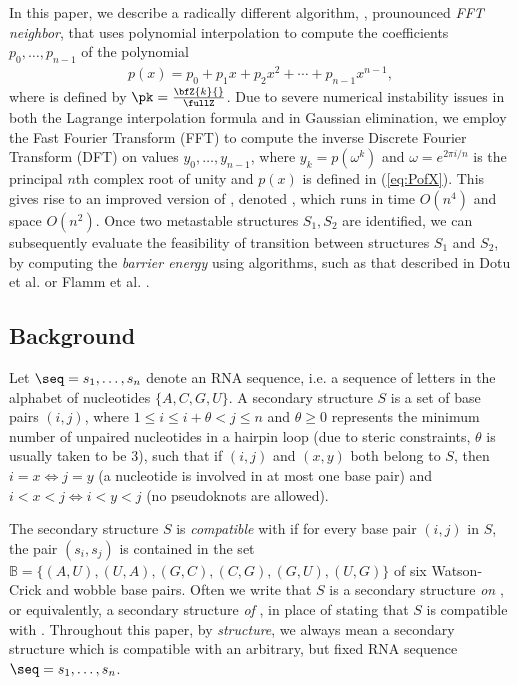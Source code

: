 In this paper, we describe a radically different algorithm, \fftbor,
prounounced {\em FFT neighbor},
that uses polynomial interpolation to compute the
coefficients $p_0,\ldots,p_{n-1}$ of the polynomial
\begin{eqnarray}
\label{eq:PofX}
p(x) = p_0 + p_1 x + p_2 x^2 + \cdots + p_{n-1} x^{n-1},
\end{eqnarray}
where \pk is defined by $\pk = \frac{\bfZ{k}{}}{\fullZ}$.
Due to severe numerical instability issues in both the Lagrange
interpolation formula and in Gaussian elimination, we employ
the Fast Fourier Transform (FFT) to compute the inverse Discrete Fourier
Transform (DFT) on values $y_0,\ldots,y_{n-1}$, where $y_k = p(\omega^k)$ and
$\omega = e^{2 \pi i/n}$ is the principal $n$th complex root of unity and
$p(x)$ is defined in (\ref{eq:PofX}). This
gives rise to an improved version of \rnabor, denoted \fftbor,
which runs in time $O(n^4)$ and space $O(n^2)$.
Once two metastable structures $S_1,S_2$ are identified, we can
subsequently evaluate the feasibility of transition between
structures $S_1$ and $S_2$,
by computing the {\em barrier energy} using algorithms, such as that
described in Dotu et al.  \citep{Dotu.nar10} or Flamm et al.
\citep{Flamm.r01}.





\subsection*{Background}

Let $\seq = s_1,\ldots,s_n$ denote an RNA sequence, i.e. a sequence
of letters in the alphabet of nucleotides $\{A,C,G,U\}$. A
secondary structure $S$ is a set of base pairs
$(i,j)$, where $1 \le i \le i+\theta < j \le n$ and $\theta \ge 0$
represents the minimum number of unpaired nucleotides in a hairpin loop
(due to steric constraints, $\theta$ is usually taken to be $3$),
such that if $(i,j)$ and $(x,y)$ both belong to $S$, then $i=x \iff j=y$
(a nucleotide is involved in at most one base pair)
and $i<x<j \iff i<y<j$ (no pseudoknots are allowed).

The secondary structure $S$ is {\em compatible}
with \seq if for every base pair $(i,j)$ in $S$, the pair
$(s_i,s_j)$ is contained in the set
$\mathbb{B} = \{(A,U), (U,A), (G,C), (C,G), (G,U), (U,G)\}$
of six Watson-Crick and wobble base pairs. Often we write that
$S$ is a secondary structure {\em on} \seq, or equivalently,
a secondary structure {\em of} \seq,
in place of stating that $S$ is compatible with \seq.
Throughout this paper, by {\em structure}, we always mean a
secondary structure which is compatible with an arbitrary, but fixed
RNA sequence $\seq=s_1,\ldots,s_n$.

